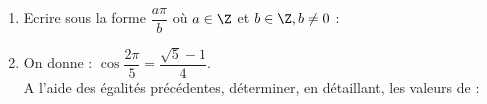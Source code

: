 \documentclass[11 pt, a4paper]{article}
\begin{document}
\begin{enumerate}
	\item Ecrire sous la forme $\dfrac{a\pi}{b}$ où $a \in \Z$ et $b \in \Z, b \neq 0$ :
	\item On donne : $\cos \dfrac{2\pi}{5}=\dfrac{\sqrt{5}-1}{4}$.\\
	A l’aide des égalités précédentes, déterminer, en détaillant, les valeurs de :\\
\end{enumerate}
\end{document}
